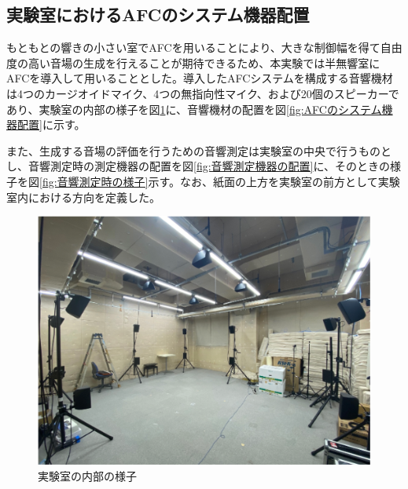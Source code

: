 \documentclass[11pt,a4j]{jreport}
\begin{document}

\newpage
\subsection*{実験室におけるAFCのシステム機器配置}
もともとの響きの小さい室でAFCを用いることにより、大きな制御幅を得て自由度の高い音場の生成を行えることが期待できるため、本実験では半無響室にAFCを導入して用いることとした。導入したAFCシステムを構成する音響機材は4つのカージオイドマイク、4つの無指向性マイク、および20個のスピーカーであり、実験室の内部の様子を図\ref{fig:実験室の内部の様子}に、音響機材の配置を図\ref{fig:AFCのシステム機器配置}に示す。

また、生成する音場の評価を行うための音響測定は実験室の中央で行うものとし、音響測定時の測定機器の配置を図\ref{fig:音響測定機器の配置}に、そのときの様子を図\ref{fig:音響測定時の様子}示す。なお、紙面の上方を実験室の前方として実験室内における方向を定義した。

\begin{figure}[H]
  \centering
  \includegraphics[width=0.6\linewidth]{images/twoPiRoom/twoPiRoomPhoto.png}
  \caption{実験室の内部の様子}
  \label{fig:実験室の内部の様子}
\end{figure}
\end{document}
